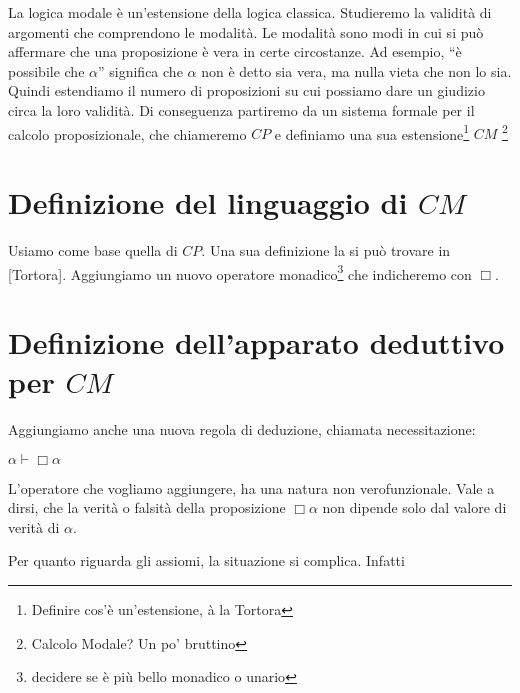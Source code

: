 \documentclass[a4paper, 12pt]{article}
\begin{document}
La logica modale è un'estensione della logica classica.
Studieremo la validità di argomenti che comprendono le modalità.
Le modalità sono modi in cui si può affermare che una proposizione è vera in certe circostanze.
Ad esempio, ``è possibile che $\alpha$'' significa che $\alpha$ non è detto sia vera, ma nulla vieta che non lo sia.
Quindi estendiamo il numero di proposizioni su cui possiamo dare un giudizio circa la loro validità.
Di conseguenza partiremo da un sistema formale per il calcolo proposizionale, che chiameremo $CP$
e definiamo una sua estensione\footnote{Definire cos'è un'estensione, à la Tortora} $CM$ \footnote{Calcolo Modale? Un po' bruttino}

\section{Definizione del linguaggio di $CM$}
Usiamo come base quella di $CP$. Una sua definizione la si può trovare in [Tortora].
Aggiungiamo un nuovo operatore monadico\footnote{decidere se è più bello monadico o unario}
che indicheremo con $\Box$.

\section{Definizione dell'apparato deduttivo per $CM$}
Aggiungiamo anche una nuova regola di deduzione, chiamata necessitazione:

$\alpha \vdash \Box \alpha$

L'operatore che vogliamo aggiungere, ha una natura non verofunzionale. Vale a dirsi,
che la verità o falsità della proposizione $\Box \alpha$ non dipende solo
dal valore di verità di $\alpha$.

Per quanto riguarda gli assiomi, la situazione si complica. Infatti 
\end{document}
